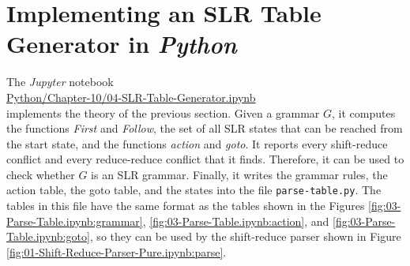 
\section{Implementing an SLR Table Generator in \textsl{Python}\label{section:slr-table-generator}}
The \textsl{Jupyter} notebook
\\[0.2cm]
\hspace*{1.3cm}
\href{https://github.com/karlstroetmann/Formal-Languages/blob/master/Python/Chapter-10/04-SLR-Table-Generator.ipynb}{Python/Chapter-10/04-SLR-Table-Generator.ipynb}
\\[0.2cm]
implements the theory of the previous section.  Given a grammar $G$, it computes the functions \textsl{First} and
\textsl{Follow}, the set of all SLR states that can be reached from the start state, and the functions
\textsl{action} and \textsl{goto}.  It reports every shift-reduce conflict and every reduce-reduce conflict that it
finds.  Therefore, it can be used to check whether $G$ is an SLR grammar.  Finally, it writes the grammar rules, the
action table, the goto table, and the states into the file \texttt{parse-table.py}.  The tables in this file have
the same format as the tables shown in the Figures \ref{fig:03-Parse-Table.ipynb:grammar},
\ref{fig:03-Parse-Table.ipynb:action}, and \ref{fig:03-Parse-Table.ipynb:goto}, so they can be used by the shift-reduce
parser shown in Figure \ref{fig:01-Shift-Reduce-Parser-Pure.ipynb:parse}.

